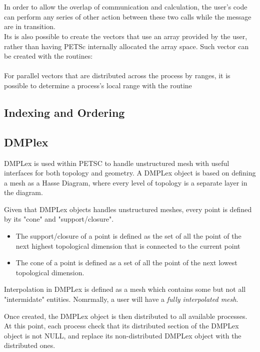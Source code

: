 \\
\\
In order to allow the overlap of communication and calculation, the user's code can perform any series of other action between these two calls  while the message are in transition. \\
Its is also possible to create the vectors that use an array provided by the user, rather than having PETSc internally allocated the array space. Such vector can be created with the routines:\\
 \\
For parallel vectors that are distributed across the process by ranges, it is possible to determine a process's local range with the routine \\

\subsection{Indexing and Ordering}
\subsection{DMPlex}
DMPLex is used within PETSC to handle unstructured mesh with useful interfaces for both topology and geometry. A DMPLex object is based on defining a mesh as a Hasse Diagram, where every level of topology is a separate layer in the diagram.

Given that DMPLex objects handles unstructured meshes, every point is defined by its "cone" and "support/closure".

\begin{itemize}
    \item The support/closure of a point is defined as the set of all the point of the next highest topological dimension that is connected to the current point
    \item The cone of a point is defined as a set of all the point of the next lowest topological dimension.
\end{itemize}

Interpolation in DMPLex is defined as a mesh which contains some but not all "intermidate" entities. Nomrmally, a user will have a \textit{fully interpolated mesh}.

Once created, the DMPLex object is then distributed to all available processes. At this point, each process check that its distributed section of the DMPLex object is not NULL, and replace its non-distributed DMPLex object with the distributed ones.